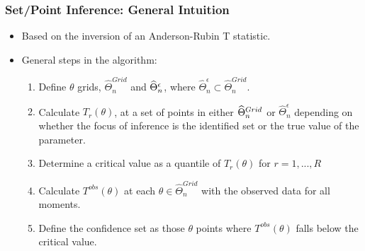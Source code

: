 \documentclass[notes=show]{beamer}
\begin{document}
\begin{frame}
\frametitle{Set/Point Inference: General Intuition}

\begin{itemize}
\item Based on the inversion of an Anderson-Rubin T statistic. 

\item General steps in the algorithm: 

\begin{enumerate}
\item Define $\theta $ grids, $\widehat{\Theta }_{n}^{Grid}$ and $\widehat{%
\Theta }_{n}^{\epsilon }$, where $\widehat{\Theta }_{n}^{\epsilon }\subset 
\widehat{\Theta }_{n}^{Grid}$. 

\item Calculate $T_{r}(\theta )$, at a set of points in either $\widehat{%
\Theta }_{n}^{Grid}$ or $\widehat{\Theta }_{n}^{\epsilon }$ depending on
whether the focus of inference is the identified set or the true value of
the parameter. 

\item Determine a critical value as a quantile of $T_{r}(\theta)$ for $%
r=1,...,R$ 

\item Calculate $T^{obs}(\theta )$ at each $\theta \in \widehat{\Theta }%
_{n}^{Grid}$ with the observed data for all moments. 

\item Define the confidence set as those $\theta$ points where $%
T^{obs}(\theta)$ falls below the critical value. 
\end{enumerate}
\end{itemize}
\end{frame}

\end{document}
